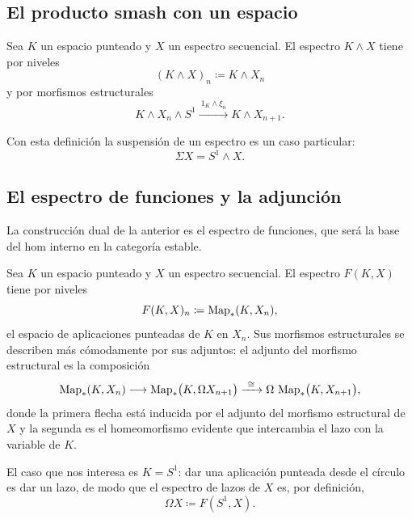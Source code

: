 \subsection{El producto smash con un espacio}

\begin{defi}\label{defi:smash-espacio}
Sea $K$ un espacio punteado y $X$ un espectro secuencial. El espectro $K\wedge X$ tiene por niveles
\[
(K\wedge X)_n\coloneqq K\wedge X_n
\]
y por morfismos estructurales
\[
K\wedge X_n\wedge S^1\xrightarrow{\ 1_K\wedge\xi_n\ }K\wedge X_{n+1}.
\]
\end{defi}

Con esta definición la suspensión de un espectro es un caso particular:
\[
\Sigma X=S^1\wedge X .
\]

\subsection{El espectro de funciones y la adjunción}

La construcción dual de la anterior es el espectro de funciones, que será la base del hom interno en la categoría estable.

\begin{defi}\label{defi:espectro-funciones}
Sea $K$ un espacio punteado y $X$ un espectro secuencial. El espectro $F(K,X)$ tiene por niveles
\[
F(K,X)_n\coloneqq\operatorname{Map}_*(K,X_n),
\]
el espacio de aplicaciones punteadas de $K$ en $X_n$. Sus morfismos estructurales se describen más cómodamente por sus adjuntos: el adjunto del morfismo estructural es la composición
\[
\Map_*(K,X_n)\longrightarrow\Map_*\bigl(K,\Omega X_{n+1}\bigr)\xrightarrow{\ \cong\ }\Omega\,\Map_*\bigl(K,X_{n+1}\bigr),
\]
donde la primera flecha está inducida por el adjunto del morfismo estructural de $X$ y la segunda es el homeomorfismo evidente que intercambia el lazo con la variable de $K$.
\end{defi}

El caso que nos interesa es $K=S^1$: dar una aplicación punteada desde el círculo es dar un lazo, de modo que el espectro de lazos de $X$ es, por definición,
\[
\Omega X\coloneqq F(S^1,X).
\]

